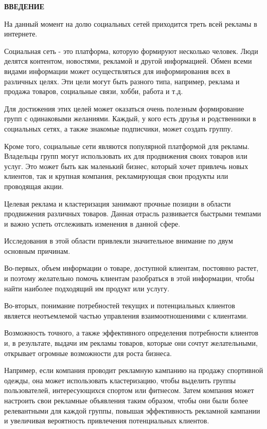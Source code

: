 \begin{center}
	\bfseries\fontsize{16}{19}\selectfont ВВЕДЕНИЕ
\end{center}

На данный момент на долю социальных сетей приходится треть всей рекламы в интернете. 

Социальная сеть - это платформа, которую формируют несколько человек. Люди делятся контентом, новостями, рекламой и другой информацией. Обмен всеми видами информации может осуществляться для информирования всех в различных целях. Эти цели могут быть разного типа, например, реклама и продажа товаров, социальные связи, хобби, работа и т.д. 

Для достижения этих целей может оказаться очень полезным формирование групп с одинаковыми желаниями. Каждый, у кого есть друзья и родственники в социальных сетях, а также знакомые подписчики, может создать группу.

Кроме того, социальные сети являются популярной платформой для рекламы. Владельцы групп могут использовать их для продвижения своих товаров или услуг. Это может быть как маленький бизнес, который хочет привлечь новых клиентов, так и крупная компания, рекламирующая свои продукты или проводящая акции.

Целевая реклама и кластеризация занимают прочные позиции в области продвижения различных товаров. Данная отрасль развивается быстрыми темпами и важно успеть отслеживать изменения в данной сфере.

Исследования в этой области привлекли значительное внимание по двум основным причинам. 

Во-первых, объем информации о товаре, доступной клиентам, постоянно растет, и поэтому желательно помочь клиентам разобраться в этой информации, чтобы найти наиболее подходящий им продукт или услугу. 

Во-вторых, понимание потребностей текущих и потенциальных клиентов является неотъемлемой частью управления взаимоотношениями с клиентами.

Возможность точного, а также эффективного определения потребности клиентов и, в результате, выдачи им рекламы товаров, которые они сочтут желательными, открывает огромные возможности для роста бизнеса.

Например, если компания проводит рекламную кампанию на продажу спортивной одежды, она может использовать кластеризацию, чтобы выделить группы пользователей, интересующихся спортом или фитнесом. Затем компания может настроить свои рекламные объявления таким образом, чтобы они были более релевантными для каждой группы, повышая эффективность рекламной кампании и увеличивая вероятность привлечения потенциальных клиентов.

